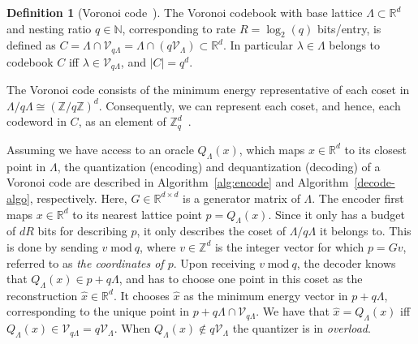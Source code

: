 \documentclass{article}
\newcommand{\RR}{\mathbb{R}}
\newcommand{\m}{\mathcal}
\newcommand{\Z}{\mathbb{Z}}
\newcommand{\mmod}[1]{\; \mathrm{mod}\ #1}
\newcommand{\ZZ}{\mathbb{Z}}
\theoremstyle{plain}
\theoremstyle{definition}
\newtheorem{definition}[theorem]{Definition}
\theoremstyle{remark}
\begin{document}

\begin{definition}[Voronoi code~\cite{ConwaySloane83}]
    The Voronoi codebook with base lattice $\Lambda\subset\RR^d$ and nesting ratio $q\in\mathbb{N}$, corresponding to rate $R=\log_2(q)$ bits/entry, is defined as $C=\Lambda\cap\m{V}_{q\Lambda}=\Lambda\cap(q\m{V}_{\Lambda})\subset\RR^d$. In particular $\lambda \in \Lambda$ belongs to codebook $C$ iff $\lambda \in \m{V}_{q\Lambda}$, and $|C|=q^d$. 
\end{definition}

The Voronoi code consists of the minimum energy representative of each coset in $\Lambda/q\Lambda\cong(\ZZ/q\ZZ)^d$. Consequently, we can represent each coset, and hence, each codeword in $C$, as an element of $\Z_q^d$~\cite{ConwaySloane83}.





Assuming we have access to an oracle $Q_{\Lambda}(x)$, which maps $x\in\RR^d$ to its closest point in $\Lambda$, the quantization (encoding) and dequantization (decoding) of a Voronoi code are described in Algorithm~\ref{alg:encode} and Algorithm~\ref{decode-algo}, respectively. Here, $G\in\RR^{d\times d}$ is a generator matrix of $\Lambda$. The encoder first maps $x\in\RR^d$ to its nearest lattice point $p=Q_{\Lambda}(x)$. Since it only has a budget of $dR$ bits for describing $p$, it only describes the coset of $\Lambda/q\Lambda$ it belongs to. This is done by sending $v\mmod q$, where $v\in\ZZ^d$ is the integer vector for which $p=Gv$, referred to as \emph{the coordinates of $p$}. Upon receiving $v\mmod q$, the decoder knows that $Q_{\Lambda}(x)\in p+q\Lambda$, and has to choose one point in this coset as the reconstruction $\hat{x}\in\RR^d$. It chooses $\hat{x}$ as the minimum energy vector in $p+q\Lambda$, corresponding to the unique point in $p+q\Lambda\cap \m{V}_{q\Lambda}$. We have that $\hat{x}=Q_{\Lambda}(x)$ iff $Q_{\Lambda}(x)\in \m{V}_{q\Lambda}=q\m{V}_{\Lambda}$. When $Q_{\Lambda}(x)\notin q\m{V}_{\Lambda}$ the quantizer is in \emph{overload}.
\end{document}
